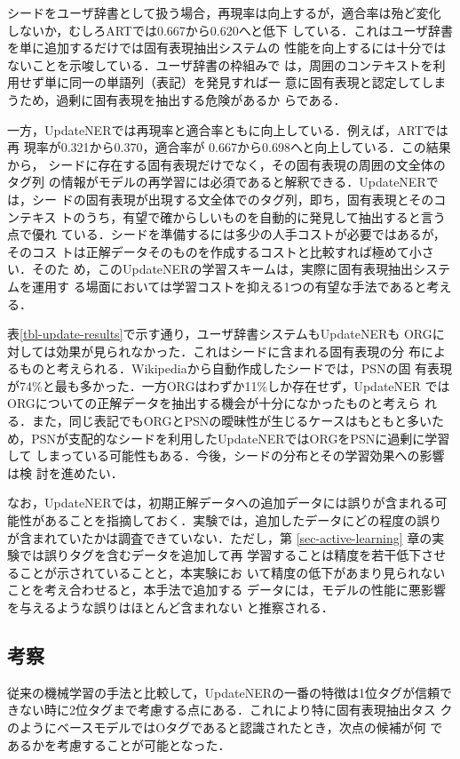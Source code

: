 \documentclass[japanese]{jnlp_1.4}
\begin{document}
シードをユーザ辞書として扱う場合，再現率は向上するが，適合率は殆ど変化
しないか，むしろARTでは0.667から0.620へと低下
している．これはユーザ辞書を単に追加するだけでは固有表現抽出システムの
性能を向上するには十分ではないことを示唆している．ユーザ辞書の枠組みで
は，周囲のコンテキストを利用せず単に同一の単語列（表記）を発見すれば一
意に固有表現と認定してしまうため，過剰に固有表現を抽出する危険があるか
らである．

一方，UpdateNERでは再現率と適合率ともに向上している．例えば，ARTでは再
現率が0.321から0.370，適合率が
0.667から0.698へと向上している．この結果から，
シードに存在する固有表現だけでなく，その固有表現の周囲の文全体のタグ列
の情報がモデルの再学習には必須であると解釈できる．UpdateNERでは，シー
ドの固有表現が出現する文全体でのタグ列，即ち，固有表現とそのコンテキス
トのうち，有望で確からしいものを自動的に発見して抽出すると言う点で優れ
ている．シードを準備するには多少の人手コストが必要ではあるが，そのコス
トは正解データそのものを作成するコストと比較すれば極めて小さい．そのた
め，このUpdateNERの学習スキームは，実際に固有表現抽出システムを運用す
る場面においては学習コストを抑える1つの有望な手法であると考える．

表\ref{tbl-update-results}で示す通り，ユーザ辞書システムもUpdateNERも
ORGに対しては効果が見られなかった．これはシードに含まれる固有表現の分
布によるものと考えられる．Wikipediaから自動作成したシードでは，PSNの固
有表現が74\%と最も多かった．一方ORGはわずか11\%しか存在せず，UpdateNER
ではORGについての正解データを抽出する機会が十分になかったものと考えら
れる．また，同じ表記でもORGとPSNの曖昧性が生じるケースはもともと多いた
め，PSNが支配的なシードを利用したUpdateNERではORGをPSNに過剰に学習して
しまっている可能性もある．今後，シードの分布とその学習効果への影響は検
討を進めたい．

なお，UpdateNERでは，初期正解データへの追加データには誤りが含まれる可
能性があることを指摘しておく．実験では，追加したデータにどの程度の誤り
が含まれていたかは調査できていない．ただし，第
\ref{sec-active-learning} 章の実験では誤りタグを含むデータを追加して再
学習することは精度を若干低下させることが示されていることと，本実験にお
いて精度の低下があまり見られないことを考え合わせると，本手法で追加する
データには，モデルの性能に悪影響を与えるような誤りはほとんど含まれない
と推察される．


\subsection{考察}

従来の機械学習の手法と比較して，UpdateNERの一番の特徴は1位タグが信頼で
きない時に2位タグまで考慮する点にある．これにより特に固有表現抽出タス
クのようにベースモデルではOタグであると認識されたとき，次点の候補が何
であるかを考慮することが可能となった．
\end{document}
